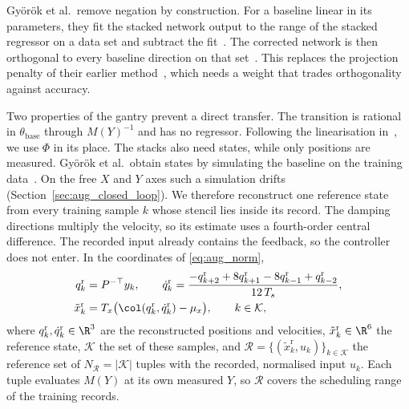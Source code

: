 Gy\"or\"ok et al.\ remove negation by construction.
For a baseline linear in its parameters, they fit the stacked network output to
the range of the stacked regressor on a data set and subtract the
fit~\cite[Eqs.~(8), (10)]{gyorok2026obc}.
The corrected network is then orthogonal to every baseline direction on that
set~\cite[Lemma~3]{gyorok2026obc}.
This replaces the projection penalty of their earlier
method~\cite[Eq.~(13)]{gyorok2025l4dc}, which needs a weight that trades
orthogonality against accuracy.

Two properties of the gantry prevent a direct transfer.
The transition is rational in $\theta_{\mathrm{base}}$ through $M(Y)^{-1}$ and
has no regressor.
Following the linearisation in~\cite[Eq.~(15)]{gyorok2025l4dc}, we use
$\Phi$ in its place.
The stacks also need states, while only positions are measured.
Gy\"or\"ok et al.\ obtain states by simulating the baseline on the training
data~\cite[Sec.~3]{gyorok2025l4dc}.
On the free $X$ and $Y$ axes such a simulation drifts
(Section~\ref{sec:aug_closed_loop}).
We therefore reconstruct one reference state from every training sample $k$
whose stencil lies inside its record.
The damping directions multiply the velocity, so its estimate uses a
fourth-order central difference.
The recorded input already contains the feedback, so the controller does not
enter.
In the coordinates of \eqref{eq:aug_norm},
\begin{equation}
\begin{aligned}
 q^{\mathrm r}_k&=P^{-\top}y_k,\qquad
 \dot q^{\mathrm r}_k=\frac{-q^{\mathrm r}_{k+2}+8q^{\mathrm r}_{k+1}
 -8q^{\mathrm r}_{k-1}+q^{\mathrm r}_{k-2}}{12\,T_s},\\
 \tilde x^{\mathrm r}_k&=T_x\bigl(\col(q^{\mathrm r}_k,\dot q^{\mathrm r}_k)-\mu_x\bigr),
 \qquad k\in\mathcal K,
\end{aligned}
\label{eq:obc_tuples}
\end{equation}
where $q^{\mathrm r}_k,\dot q^{\mathrm r}_k\in\R^3$ are the reconstructed
positions and velocities, $\tilde x^{\mathrm r}_k\in\R^6$ the reference state,
$\mathcal K$ the set of these samples, and
$\mathcal R=\{(\tilde x^{\mathrm r}_k,u_k)\}_{k\in\mathcal K}$ the reference
set of $N_{\mathcal R}=|\mathcal K|$ tuples with the recorded, normalised
input $u_k$.
Each tuple evaluates $M(Y)$ at its own measured $Y$, so $\mathcal R$ covers
the scheduling range of the training records.

